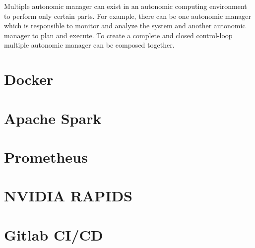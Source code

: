 Multiple autonomic manager can exist in an autonomic computing environment to perform only certain parts. For example, 
there can be one autonomic manager which is responsible to monitor and analyze the system and another autonomic manager 
to plan and execute. To create a complete and closed control-loop multiple autonomic manager can be composed together.

\section{Docker}


\section{Apache Spark}


\section{Prometheus}


\section{NVIDIA RAPIDS}


\section{Gitlab CI/CD}
